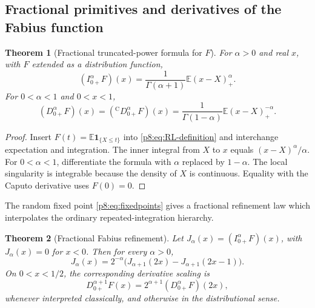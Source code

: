 \documentclass[11pt,oneside]{article}
\newtheorem{theorem}{Theorem}[section]
\theoremstyle{definition}
\theoremstyle{remark}
\newcommand{\E}{\mathbb E}
\newcommand{\1}{\mathbf 1}
\begin{document}
\subsection{Fractional primitives and derivatives of the Fabius function}

\begin{theorem}[Fractional truncated-power formula for \(F\)]
\label{p8:thm:F-fractional}
For \(\alpha>0\) and real \(x\), with \(F\) extended as a distribution
function,
\begin{equation}
 \boxed{
 (I_{0+}^{\alpha}F)(x)
 =\frac1{\Gamma(\alpha+1)}\E(x-X)_+^{\alpha}.}
 \label{p8:eq:F-fractional-integral}
\end{equation}
For \(0<\alpha<1\) and \(0<x<1\),
\begin{equation}
 \boxed{
 (D_{0+}^{\alpha}F)(x)
 =({}^{\mathrm C}D_{0+}^{\alpha}F)(x)
 =\frac1{\Gamma(1-\alpha)}\E(x-X)_+^{-\alpha}.}
 \label{p8:eq:F-fractional-derivative}
\end{equation}
\statusprovedPartll
\end{theorem}

\begin{proof}
Insert \(F(t)=\E\mathbf1_{\{X\le t\}}\) into \eqref{p8:eq:RL-definition} and
interchange expectation and integration.  The inner integral from \(X\) to
\(x\) equals \((x-X)^\alpha/\alpha\).  For \(0<\alpha<1\), differentiate the
formula with \(\alpha\) replaced by \(1-\alpha\).  The local singularity is
integrable because the density of \(X\) is continuous.  Equality with the
Caputo derivative uses \(F(0)=0\).
\end{proof}

The random fixed point \eqref{p8:eq:fixedpoints} gives a fractional refinement law
which interpolates the ordinary repeated-integration hierarchy.

\begin{theorem}[Fractional Fabius refinement]
\label{p8:thm:F-fractional-refinement}
Let \(J_\alpha(x)=(I_{0+}^{\alpha}F)(x)\), with \(J_\alpha(x)=0\) for
\(x<0\).  Then for every \(\alpha>0\),
\begin{equation}
 \boxed{
 J_\alpha(x)=2^{-\alpha}
 \bigl(J_{\alpha+1}(2x)-J_{\alpha+1}(2x-1)\bigr).}
 \label{p8:eq:F-fractional-refinement}
\end{equation}
On \(0<x<1/2\), the corresponding derivative scaling is
\begin{equation}
 D_{0+}^{\alpha+1}F(x)
 =2^{\alpha+1}(D_{0+}^{\alpha}F)(2x),
 \label{p8:eq:F-fractional-derivative-scaling}
\end{equation}
whenever interpreted classically, and otherwise in the distributional sense.
\statusprovedPartll
\end{theorem}
\end{document}
